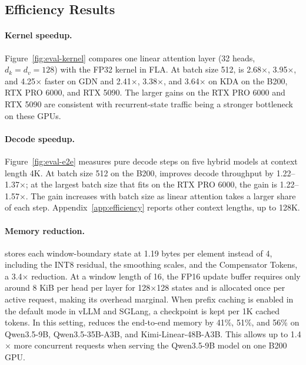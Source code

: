 \subsection{Efficiency Results}
\label{sec:efficiency}




\paragraph{Kernel speedup.}
Figure~\ref{fig:eval-kernel} compares one linear attention layer (32 heads, $d_k=d_v=128$) with the FP32 kernel in FLA.
At batch size 512, \method{} is 2.68$\times$, 3.95$\times$, and 4.25$\times$ faster on GDN and 2.41$\times$, 3.38$\times$, and 3.64$\times$ on KDA on the B200, RTX PRO 6000, and RTX 5090.
The larger gains on the RTX PRO 6000 and RTX 5090 are consistent with recurrent-state traffic being a stronger bottleneck on these GPUs.

\paragraph{Decode speedup.}
Figure~\ref{fig:eval-e2e} measures pure decode steps on five hybrid models at context length 4K.
At batch size 512 on the B200, \method{} improves decode throughput by 1.22--1.37$\times$; at the largest batch size that fits on the RTX PRO 6000, the gain is 1.22--1.57$\times$. The gain increases with batch size as linear attention takes a larger share of each step.
Appendix~\ref{app:efficiency} reports other context lengths, up to 128K.



\paragraph{Memory reduction.}
\method{} stores each window-boundary state at 1.19 bytes per element instead of 4, including the INT8 residual, the smoothing scales, and the Compensator Tokens, a 3.4$\times$ reduction.
At a window length of 16, the FP16 update buffer requires only around 8 KiB per head per layer for 128$\times$128 states and is allocated once per active request, making its overhead marginal.
When prefix caching is enabled in the default mode in vLLM and SGLang, a checkpoint is kept per 1K cached tokens.
In this setting, \method{} reduces the end-to-end memory by 41\%, 51\%, and 56\% on Qwen3.5-9B, Qwen3.5-35B-A3B, and Kimi-Linear-48B-A3B.
This allows up to 1.4$\times$ more concurrent requests when serving the Qwen3.5-9B model on one B200 GPU.

